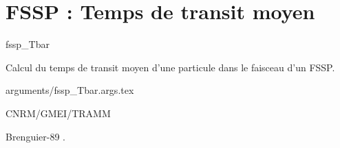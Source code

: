 %
\section{FSSP : Temps de transit moyen}

 {\sf fssp\_Tbar}

Calcul du temps de transit moyen d'une particule
dans le faisceau d'un FSSP. 

\bigskip
 {arguments/fssp_Tbar.args.tex}




CNRM/GMEI/TRAMM

Brenguier-89 \cite{Brenguier-89}.
